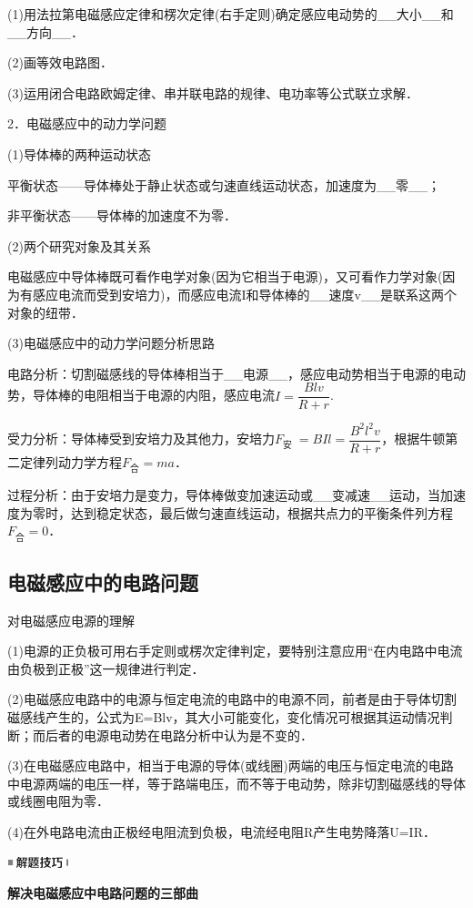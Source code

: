 (1)用法拉第电磁感应定律和楞次定律(右手定则)确定感应电动势的\_\_大小\_\_和\_\_方向\_\_．

(2)画等效电路图．

(3)运用闭合电路欧姆定律、串并联电路的规律、电功率等公式联立求解．

2．电磁感应中的动力学问题

(1)导体棒的两种运动状态

平衡状态------导体棒处于静止状态或匀速直线运动状态，加速度为\_\_零\_\_；

非平衡状态------导体棒的加速度不为零．

(2)两个研究对象及其关系

电磁感应中导体棒既可看作电学对象(因为它相当于电源)，又可看作力学对象(因为有感应电流而受到安培力)，而感应电流I和导体棒的\_\_速度v\_\_是联系这两个对象的纽带．

(3)电磁感应中的动力学问题分析思路

电路分析：切割磁感线的导体棒相当于\_\_电源\_\_，感应电动势相当于电源的电动势，导体棒的电阻相当于电源的内阻，感应电流$I=\dfrac{B l v}{R+r}$.　　

受力分析：导体棒受到安培力及其他力，安培力$F_{\text {安 }}=B I l=\dfrac{B^{2} l^{2} v}{R+r}$，根据牛顿第二定律列动力学方程$F_{\text{合}}=ma$．

过程分析：由于安培力是变力，导体棒做变加速运动或\_\_变减速\_\_运动，当加速度为零时，达到稳定状态，最后做匀速直线运动，根据共点力的平衡条件列方程$F_{\text{合}}=0$．
\newpage
\subsection{电磁感应中的电路问题}

对电磁感应电源的理解

(1)电源的正负极可用右手定则或楞次定律判定，要特别注意应用``在内电路中电流由负极到正极''这一规律进行判定．

(2)电磁感应电路中的电源与恒定电流的电路中的电源不同，前者是由于导体切割磁感线产生的，公式为E=Blv，其大小可能变化，变化情况可根据其运动情况判断；而后者的电源电动势在电路分析中认为是不变的．

(3)在电磁感应电路中，相当于电源的导体(或线圈)两端的电压与恒定电流的电路中电源两端的电压一样，等于路端电压，而不等于电动势，除非切割磁感线的导体或线圈电阻为零．

(4)在外电路电流由正极经电阻流到负极，电流经电阻R产生电势降落U=IR．

\begin{center}\includegraphics[width=0.70764in,height=0.12292in]{media/image37.png}\end{center}
\begin{center}
	\textbf{解决电磁感应中电路问题的三部曲}
\end{center}

